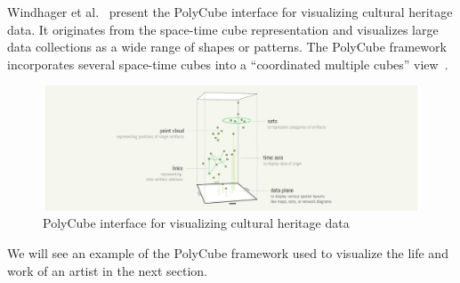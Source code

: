 Windhager et al.~\citep{windhager2018orchestrating} present the PolyCube interface for visualizing cultural heritage
data. It originates from the space-time cube representation and visualizes large data collections as a wide range of shapes or patterns.
The PolyCube framework incorporates several space-time cubes into a “coordinated multiple cubes” view~\citep{windhager2020many}.

\begin{figure}[hbt!]
    \begin{center}
        \includegraphics[width=\textwidth]{graphics/2-literature-review/21a}
    \end{center}
    \caption{PolyCube interface for visualizing cultural heritage data}
    \label{fig:figure2.21a}
\end{figure}

We will see an example of the PolyCube framework used to visualize the life and work of an artist in the next section.






